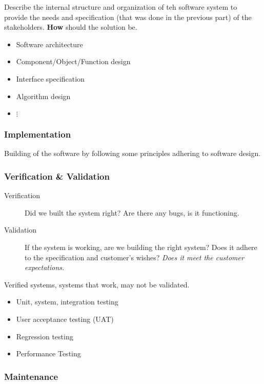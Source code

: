 \documentclass[11pt,a4paper,twocolumn]{book}
\begin{document}
Describe the internal structure and organization of teh software system to provide the needs and specification (that was done in the previous part) of the stakeholders. \textbf{How} should the solution be.

\begin{itemize}
\item Software architecture
\item Component/Object/Function design
\item Interface specification
\item Algorithm design
\item $\vdots$
\end{itemize}

\subsubsection{Implementation}

Building of the software by following some principles adhering to software design.

\subsubsection{Verification \& Validation}

\begin{description}
\item[Verification] Did we built the system right? Are there any bugs, is it functioning.
\item[Validation] If the system is working, are we building the right system? Does it adhere to the specification and customer's wishes? \textit{Does it meet the customer expectations.}
\end{description}

Verified systems, systems that work, may not be validated.

\begin{itemize}
\item Unit, system, integration testing
\item User acceptance testing (UAT)
\item Regression testing
\item Performance Testing
\end{itemize}

\subsubsection{Maintenance}
\end{document}
